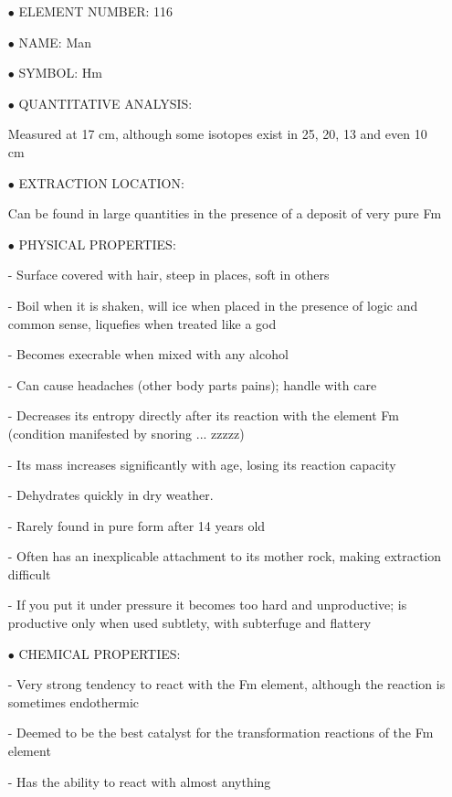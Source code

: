 \begin{itemize}
	\item[$\bullet$] ELEMENT NUMBER: 116

	\item[$\bullet$] NAME: Man

	\item[$\bullet$] SYMBOL: Hm

	\item[$\bullet$] QUANTITATIVE ANALYSIS:	

Measured at 17 cm, although some isotopes exist in 25, 20, 13 and even 10 cm

	\item[$\bullet$] EXTRACTION LOCATION:	

Can be found in large quantities in the presence of a deposit of very pure Fm

	\item[$\bullet$] PHYSICAL PROPERTIES:

- Surface covered with hair, steep in places, soft in others

- Boil when it is shaken, will ice when placed in the presence of logic and common sense, liquefies when treated like a god

- Becomes execrable when mixed with any alcohol

- Can cause headaches (other body parts pains); handle with care

- Decreases its entropy directly after its reaction with the element Fm (condition manifested by snoring ... zzzzz)

- Its mass increases significantly with age, losing its reaction capacity

- Dehydrates quickly in dry weather.

- Rarely found in pure form after 14 years old

- Often has an inexplicable attachment to its mother rock, making extraction difficult

- If you put it under pressure it becomes too hard and unproductive; is productive only when used subtlety, with subterfuge and flattery

	\item[$\bullet$] CHEMICAL PROPERTIES:

- Very strong tendency to react with the Fm element, although the reaction is sometimes endothermic

- Deemed to be the best catalyst for the transformation reactions of the Fm element

- Has the ability to react with almost anything


\end{itemize}
